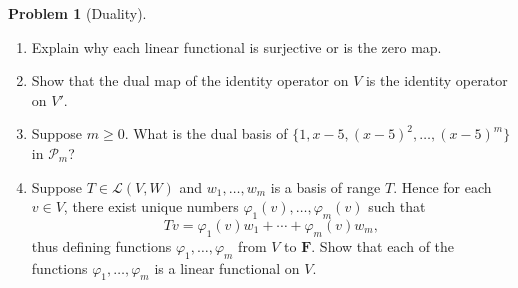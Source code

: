 \documentclass[12pt]{article}
\theoremstyle{definition}
\newtheorem{problem}{Problem}
\begin{document}
\begin{problem}[Duality]~
\begin{enumerate}
    \item Explain why each linear functional is surjective or is the zero map.
    \item Show that the dual map of the identity operator on $V$ is the identity operator
    on $V'$.
    \item Suppose $m\geq 0$. What is the dual basis of $\{1,x-5,(x-5)^2, \ldots, (x-5)^m\}$ in $\mathcal{P}_m$?
    \item Suppose $T \in \mathcal{L}(V, W)$ and $w_1, \ldots, w_m$ is a basis of range $T$. Hence for each $v \in V$, there exist unique numbers $\varphi_1(v), \ldots, \varphi_m(v)$ such that
    $$
    T v=\varphi_1(v) w_1+\cdots+\varphi_m(v) w_m,
    $$
    thus defining functions $\varphi_1, \ldots, \varphi_m$ from $V$ to $\mathbf{F}$. Show that each of the functions $\varphi_1, \ldots, \varphi_m$ is a linear functional on $V$.
\end{enumerate}
\end{problem}
\end{document}

